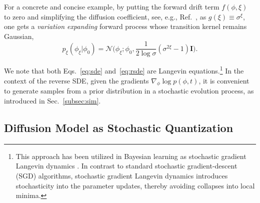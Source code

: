 For a concrete and concise example, by putting the forward drift term $f(\phi,\xi)$ to zero and simplifying the diffusion coefficient, see, e.g., Ref.~\cite{song2021scorebased}, as $g(\xi) \equiv \sigma^{\xi}$, one gets a \textit{variation expanding} forward process whose transition kernel remains Gaussian,
\begin{equation}
    p_{\xi}(\phi_\xi | \phi_0) = \mathcal{N}\bigg(\phi_\xi; \phi_0, \frac{1}{2\log \sigma}(\sigma^{2\xi} - 1) \mathbf{I}\bigg).
    \label{eq:sbm}
\end{equation}


We note that both Eqs.~\eqref{eq:sde} and~\eqref{eq:rsde} are Langevin equations.\footnote{This approach has been utilized in Bayesian learning as stochastic gradient Langevin dynamics \cite{welling:2011bayesian}. In contrast to standard stochastic gradient-descent (SGD) algorithms, stochastic gradient Langevin dynamics introduces stochasticity into the parameter updates, thereby avoiding collapses into local minima.} In the context of the reverse SDE, given the gradients $\nabla_{\phi}\log p(\phi,t)$, it is convenient to generate samples from a prior distribution in {a stochastic evolution process, as introduced in Sec.~\ref{subsec:sim}.}


\subsection{Diffusion Model as Stochastic Quantization}

